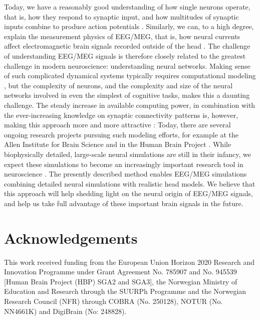 \documentclass[preprint,10pt,authoryear]{elsarticle}
\begin{document}
Today, we have a reasonably good understanding of how single neurons operate, that is, how they respond to synaptic input, and how multitudes of synaptic inputs combine to produce action potentials \citep{EINEVOLL2019}.
Similarly, we can, to a high degree, explain the measurement physics of EEG/MEG, that is, how neural currents affect electromagnetic brain signals recorded outside of the head \citep{NUNEZ2006, COHEN2017,Ilmoniemi2019}.
The challenge of understanding EEG/MEG signals is therefore closely related to the greatest challenge in modern neuroscience: understanding neural networks. 
Making sense of such complicated dynamical systems typically requires computational modeling \citep{EINEVOLL2019}, but the complexity of neurons, and the complexity and size of the neural networks involved in even the simplest of cognitive tasks, makes this a daunting challenge.
The steady increase in available computing power, in combination with the ever-increasing knowledge on synaptic connectivity patterns is, however, making this approach more and more attractive \citep{Reimann2013, Egger2014, MARKRAM2015, HAGEN2016, Gratiy2018, Arkhipov2018, Reimann2019, BILLEH2019}: Today, there are several ongoing research projects pursuing such modeling efforts, for example at the Allen Institute for Brain Science and in the Human Brain Project \citep{EINEVOLL2019}.
While biophysically detailed, large-scale neural simulations are still in their infancy, we expect these simulations to become an increasingly important research tool in neuroscience \citep{EINEVOLL2019}.
The presently described method enables EEG/MEG simulations combining detailed neural simulations with realistic head models. We believe that this approach will help shedding light on the neural origin of EEG/MEG signals, and help us take full advantage of these important brain signals in the future.

\section*{Acknowledgements}
This work received funding from the European Union Horizon 2020 Research and Innovation Programme under 
Grant Agreement No. 785907 and No. 945539 [Human Brain Project (HBP) SGA2 and SGA3], 
the Norwegian Ministry of Education and Research through the SUURPh Programme and the Norwegian Research Council (NFR) 
through COBRA (No. 250128), NOTUR (No. NN4661K) and DigiBrain (No: 248828).
\end{document}
